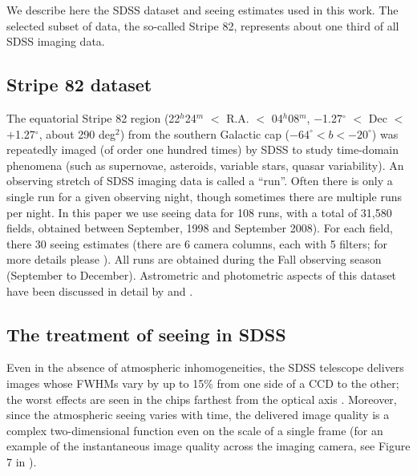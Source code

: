 

We describe here the SDSS dataset and seeing estimates used in this work. The
selected subset of data, the so-called Stripe 82, represents about one third of
all SDSS imaging data. 

\subsection{Stripe 82 dataset} 

The equatorial Stripe 82 region (22$^h$24$^m$ $<$ R.A. $<$ 04$^h$08$^m$, 
$-$1.27$^\circ$  $<$ Dec $<$ $+$1.27$^\circ$, about 
290 deg$^2$) from the southern Galactic cap ($-64^\circ < b <  -20^\circ$) was repeatedly imaged (of order
one hundred times) by SDSS to study time-domain phenomena (such as supernovae, asteroids, variable stars, quasar 
variability).  An observing stretch of SDSS imaging data is called a ``run''. Often there is only a single
run for a given observing night, though sometimes there are multiple
runs per night. In this paper we use seeing data for 
108 runs, with a total of 31,580 fields, obtained between September, 1998 and September 2008). 
For each field, there 30 seeing estimates (there are 6 camera columns, each with 5 filters; for more
details please \citealt{Gunn2006}). All runs are obtained during the Fall observing season (September to 
December). Astrometric and photometric aspects of this dataset have been discussed in detail by 
\cite{Ivezic2007} and \cite{Sesar2007}. 


\subsection{The treatment of seeing in SDSS}
 
Even in the absence of atmospheric inhomogeneities, the SDSS telescope delivers images whose 
FWHMs vary by up to 15\% from one side of a CCD to the other; the worst effects are seen in 
the chips farthest from the optical axis \citep{Gunn2006}. Moreover, since the atmospheric 
seeing varies with time, the delivered image quality is a complex two-dimensional function 
even on the scale of a single frame (for an example of the instantaneous image quality across 
the imaging camera, see Figure 7 in \citealt{SDSSEDR}). 
 

